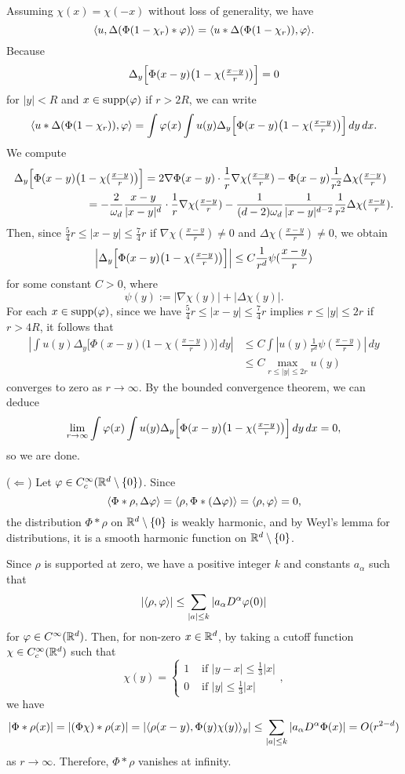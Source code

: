 \documentclass[a4paper]{article}
\begin{document}
\begin{pf}
Assuming $\chi(x)=\chi(-x)$ without loss of generality, we have
\[\langle u,\Delta(\Phi(1-\chi_r)*\varphi)\rangle=\langle u*\Delta(\Phi(1-\chi_r)),\varphi\rangle.\]
Because
\[\Delta_y\Bigl[\Phi(x-y)\bigl(1-\chi(\tfrac{x-y}r)\bigr)\Bigr]=0\]
for $|y|<R$ and $x\in\operatorname{supp}(\varphi)$ if $r>2R$, we can write
\[\langle u*\Delta(\Phi(1-\chi_r)),\varphi\rangle
=\int\varphi(x)\int u(y)\Delta_y\Bigl[\Phi(x-y)\bigl(1-\chi(\tfrac{x-y}r)\bigr)\Bigr]\,dy\,dx.\]
We compute
\begin{align*}
\Delta_y\Bigl[\Phi(x-y)\bigl(1&-\chi(\tfrac{x-y}r)\bigr)\Bigr]
=2\nabla\Phi(x-y)\cdot\frac1r\nabla\chi(\tfrac{x-y}r)-\Phi(x-y)\frac1{r^2}\Delta\chi(\tfrac{x-y}r)\\
&=-\frac2{\omega_d}\frac{x-y}{|x-y|^d}\cdot\frac1r\nabla\chi(\tfrac{x-y}r)
-\frac1{(d-2)\omega_d}\frac1{|x-y|^{d-2}}\frac1{r^2}\Delta\chi(\tfrac{x-y}r).
\end{align*}
Then, since $\frac54r\le|x-y|\le\frac74r$ if $\nabla\chi(\tfrac{x-y}r)\ne0$ and $\Delta\chi(\tfrac{x-y}r)\ne0$, we obtain
\[\Bigl|\Delta_y\Bigl[\Phi(x-y)\bigl(1-\chi(\tfrac{x-y}r)\bigr)\Bigr]\Bigr|\le C\frac1{r^d}\psi(\frac{x-y}r)\]
for some constant $C>0$, where
\[\psi(y):=|\nabla\chi(y)|+|\Delta\chi(y)|.\]
For each $x\in\operatorname{supp}(\varphi)$, since we have $\frac54r\le|x-y|\le\frac74r$ implies $r\le|y|\le2r$ if $r>4R$, it follows that
\begin{align*}
|\int u(y)\Delta_y\bigl[\Phi(x-y)\bigl(1-\chi(\tfrac{x-y}r)\bigr)\bigr]\,dy|
&\le C\int|u(y)\frac1{r^d}\psi(\frac{x-y}r)|\,dy\\
&\le C\max_{r\le|y|\le2r}u(y)
\end{align*}
converges to zero as $r\to\infty$.
By the bounded convergence theorem, we can deduce
\[\lim_{r\to\infty}\int\varphi(x)\int u(y)\Delta_y\Bigl[\Phi(x-y)\bigl(1-\chi(\tfrac{x-y}r)\bigr)\Bigr]\,dy\,dx=0,\]
so we are done.

($\Leftarrow$)
Let $\varphi\in C_c^\infty(\mathbb{R}^d\setminus\{0\})$.
Since
\[\langle\Phi*\rho,\Delta\varphi\rangle=\langle\rho,\Phi*(\Delta\varphi)\rangle=\langle\rho,\varphi\rangle=0,\]
the distribution $\Phi*\rho$ on $\mathbb{R}^d\setminus\{0\}$ is weakly harmonic, and by Weyl's lemma for distributions, it is a smooth harmonic function on $\mathbb{R}^d\setminus\{0\}$.

Since $\rho$ is supported at zero, we have a positive integer $k$ and constants $a_\alpha$ such that
\[|\langle\rho,\varphi\rangle|\le\sum_{|a|\le k}|a_\alpha D^\alpha\varphi(0)|\]
for $\varphi\in C^\infty(\mathbb{R}^d)$.
Then, for non-zero $x\in\mathbb{R}^d$, by taking a cutoff function $\chi\in C_c^\infty(\mathbb{R}^d)$ such that
\[\chi(y)=\begin{cases}1&\text{ if }|y-x|\le\frac13|x|\\0&\text{ if }|y|\le\frac13|x|\end{cases},\]
we have
\[|\Phi*\rho(x)|=|(\Phi\chi)*\rho(x)|=|\langle\rho(x-y),\Phi(y)\chi(y)\rangle_y|\le\sum_{|a|\le k}|a_\alpha D^\alpha\Phi(x)|=O(r^{2-d})\]
as $r\to\infty$.
Therefore, $\Phi*\rho$ vanishes at infinity.
\end{pf}
\end{document}
